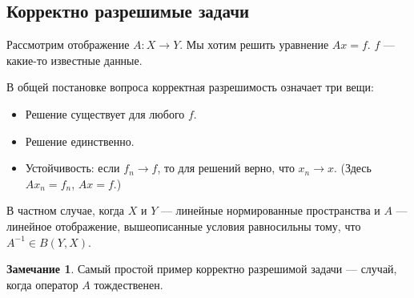 \documentclass[11pt,openany,a4paper]{scrartcl}
\theoremstyle{plain}
\theoremstyle{definition}
\newtheorem{remark}[theorem]{Замечание}
\begin{document}
\subsection{Корректно разрешимые задачи}

Рассмотрим отображение $A: X \to Y$. Мы хотим решить уравнение $Ax = f$. $f$ —
какие-то известные данные.

В общей постановке вопроса корректная разрешимость означает три вещи:
\begin{itemize}
    \item Решение существует для любого $f$.
    \item Решение единственно.
    \item Устойчивость: если $f_n \to f$, то для решений верно, что $x_n \to x$. 
    (Здесь $Ax_n = f_n$, $Ax = f$.)
\end{itemize}

В частном случае, когда $X$ и $Y$ — линейные нормированные пространства и
$A$ — линейное отображение, вышеописанные условия равносильны тому, что
$A^{-1} \in B(Y, X)$.

\begin{remark}
    Самый простой пример корректно разрешимой задачи — случай, когда оператор
    $A$ тождественен.
\end{remark}
\end{document}
